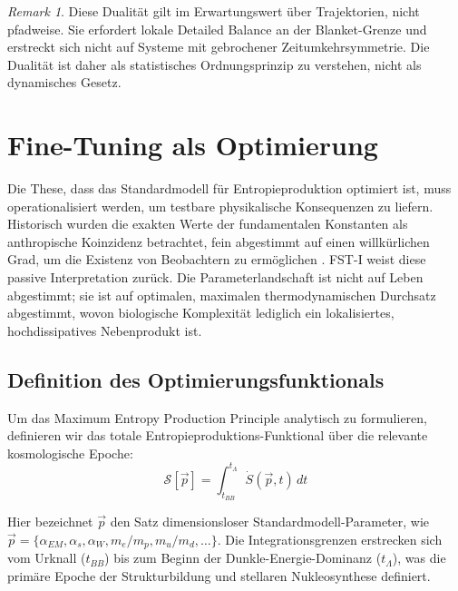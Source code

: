 \documentclass[12pt,a4paper]{article}
\theoremstyle{remark}
\newtheorem{remark}{Remark}
\begin{document}
\begin{remark}
Diese Dualit\"at gilt im Erwartungswert \"uber Trajektorien, nicht pfadweise. Sie erfordert lokale Detailed Balance an der Blanket-Grenze und erstreckt sich nicht auf Systeme mit gebrochener Zeitumkehrsymmetrie. Die Dualit\"at ist daher als statistisches Ordnungsprinzip zu verstehen, nicht als dynamisches Gesetz.
\end{remark}

\section{Fine-Tuning als Optimierung}
\label{sec:finetuning}

Die These, dass das Standardmodell f\"ur Entropieproduktion optimiert ist, muss operationalisiert werden, um testbare physikalische Konsequenzen zu liefern. Historisch wurden die exakten Werte der fundamentalen Konstanten als anthropische Koinzidenz betrachtet, fein abgestimmt auf einen willk\"urlichen Grad, um die Existenz von Beobachtern zu erm\"oglichen \citep{Adams2019}. FST-I weist diese passive Interpretation zur\"uck. Die Parameterlandschaft ist nicht auf Leben abgestimmt; sie ist auf optimalen, maximalen thermodynamischen Durchsatz abgestimmt, wovon biologische Komplexit\"at lediglich ein lokalisiertes, hochdissipatives Nebenprodukt ist.

\subsection{Definition des Optimierungsfunktionals}

Um das Maximum Entropy Production Principle analytisch zu formulieren, definieren wir das totale Entropieproduktions-Funktional \"uber die relevante kosmologische Epoche:
\begin{equation}
\mathcal{S}[\vec{p}] = \int_{t_{BB}}^{t_\Lambda} \dot{S}(\vec{p}, t) \, dt
\end{equation}

Hier bezeichnet $\vec{p}$ den Satz dimensionsloser Standardmodell-Parameter, wie $\vec{p} = \{\alpha_{EM}, \alpha_s, \alpha_W, m_e/m_p, m_u/m_d, \ldots\}$. Die Integrationsgrenzen erstrecken sich vom Urknall ($t_{BB}$) bis zum Beginn der Dunkle-Energie-Dominanz ($t_\Lambda$), was die prim\"are Epoche der Strukturbildung und stellaren Nukleosynthese definiert.
\end{document}
